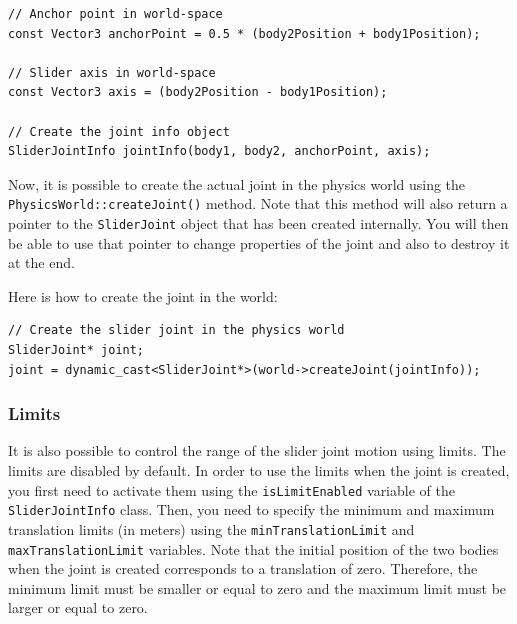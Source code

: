 \documentclass[a4paper,12pt]{article}
\begin{document}
    \begin{lstlisting}
// Anchor point in world-space
const Vector3 anchorPoint = 0.5 * (body2Position + body1Position);

// Slider axis in world-space
const Vector3 axis = (body2Position - body1Position);

// Create the joint info object
SliderJointInfo jointInfo(body1, body2, anchorPoint, axis);
  \end{lstlisting}

    \vspace{0.6cm}

    \begin{sloppypar}
    Now, it is possible to create the actual joint in the physics world using the \texttt{PhysicsWorld::createJoint()} method.
    Note that this method will also return a pointer to the \texttt{SliderJoint} object that has been created internally. You will then
    be able to use that pointer to change properties of the joint and also to destroy it at the end. \\
    \end{sloppypar}

    Here is how to create the joint in the world: \\

    \begin{lstlisting}
// Create the slider joint in the physics world
SliderJoint* joint;
joint = dynamic_cast<SliderJoint*>(world->createJoint(jointInfo));
  \end{lstlisting}

    \subsubsection{Limits}

    It is also possible to control the range of the slider joint motion using limits. The limits are disabled by default. In order to use the limits when the joint is created, you first
    need to activate them using the \texttt{isLimitEnabled} variable of the \texttt{SliderJointInfo} class. Then, you need to specify the minimum and maximum translation limits
    (in meters) using the \texttt{minTranslationLimit} and \texttt{maxTranslation\-Limit} variables. Note that the initial position of the two bodies when the joint is created
    corresponds to a translation of zero. Therefore, the minimum limit must be smaller or equal to zero and the maximum limit must be larger or equal to zero. \\
\end{document}

